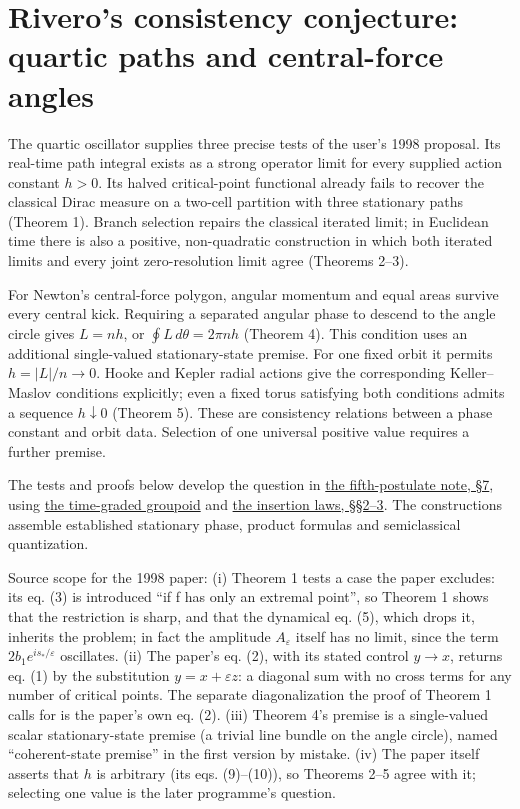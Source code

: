 \documentclass[11pt,a4paper]{article}
\begin{document}
\hypertarget{riveros-consistency-conjecture-quartic-paths-and-central-force-angles}{%
\section{Rivero's consistency conjecture: quartic paths and
central-force
angles}\label{riveros-consistency-conjecture-quartic-paths-and-central-force-angles}}

The quartic oscillator supplies three precise tests of the user's 1998
proposal. Its real-time path integral exists as a strong operator limit
for every supplied action constant \(h>0\). Its halved critical-point
functional already fails to recover the classical Dirac measure on a
two-cell partition with three stationary paths (Theorem 1). Branch
selection repairs the classical iterated limit; in Euclidean time there
is also a positive, non-quadratic construction in which both iterated
limits and every joint zero-resolution limit agree (Theorems 2--3).

For Newton's central-force polygon, angular momentum and equal areas
survive every central kick. Requiring a separated angular phase to
descend to the angle circle gives \(L=n h\), or
\(\oint L\,d\theta=2\pi n h\) (Theorem 4). This condition uses an
additional single-valued stationary-state premise. For one fixed orbit
it permits \(h=|L|/n\to0\). Hooke and Kepler radial actions give the
corresponding Keller--Maslov conditions explicitly; even a fixed torus
satisfying both conditions admits a sequence \(h\downarrow0\) (Theorem
5). These are consistency relations between a phase constant and orbit
data. Selection of one universal positive value requires a further
premise.

The tests and proofs below develop the question in
\href{principia-fifth-postulate.md}{the fifth-postulate note, §7}, using
\href{groupoid-quantum-newton-states.md\#geometric-zoom-and-kernel-composition}{the
time-graded groupoid} and \href{refinement-composition-and-limit.md}{the
insertion laws, §§2--3}. The constructions assemble established
stationary phase, product formulas and semiclassical quantization.

Source scope for the 1998 paper: (i) Theorem 1 tests a case the paper
excludes: its eq. (3) is introduced ``if f has only an extremal point'',
so Theorem 1 shows that the restriction is sharp, and that the dynamical
eq. (5), which drops it, inherits the problem; in fact the amplitude
\(A_\varepsilon\) itself has no limit, since the term
\(2b_1e^{is_*/\varepsilon}\) oscillates. (ii) The paper's eq. (2), with
its stated control \(y\to x\), returns eq. (1) by the substitution
\(y=x+\varepsilon z\): a diagonal sum with no cross terms for any number
of critical points. The separate diagonalization the proof of Theorem 1
calls for is the paper's own eq. (2). (iii) Theorem 4's premise is a
single-valued scalar stationary-state premise (a trivial line bundle on
the angle circle), named ``coherent-state premise'' in the first version
by mistake. (iv) The paper itself asserts that \(h\) is arbitrary (its
eqs. (9)--(10)), so Theorems 2--5 agree with it; selecting one value is
the later programme's question.
\end{document}

